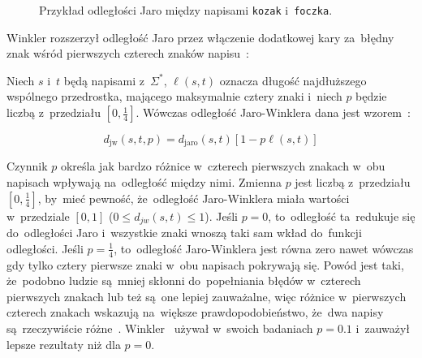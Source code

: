 \documentclass{praca1}
\begin{document}
\begin{figure}[width=80pt]
\centering
{}
\cprotect\caption{Przykład odległości Jaro między napisami \verb|kozak| i~\verb|foczka|.}\label{rys:005}
\end{figure}


Winkler rozszerzył odległość Jaro przez włączenie dodatkowej kary za~błędny znak wśród pierwszych czterech znaków napisu~\cite{Loo2014:stringdist}:

\begin{definition}
Niech $s$ i~$t$ będą napisami z~$\Sigma^*$, $\ell(s,t)$ oznacza długość najdłuższego wspólnego przedrostka, mającego maksymalnie cztery znaki i~niech $p$ będzie liczbą z~przedziału $[0, \frac{1}{4}]$. Wówczas odległość Jaro-Winklera dana jest wzorem~\cite{Winkler1990:stringcomparator}:

\begin{equation}
\label{eq:012}
d_{\mathrm{jw}}(s,t, p) = d_{\mathrm{jaro}}(s,t)[1 - p\ell(s,t)]
\end{equation}
\end{definition}

Czynnik $p$ określa jak bardzo różnice w~czterech pierwszych znakach w~obu napisach wpływają na~odległość między nimi. Zmienna $p$ jest liczbą z~przedziału $[0, \frac{1}{4}]$, by~mieć pewność, że~odległość Jaro-Winklera miała wartości w~przedziale $[0,1]$ ($0 \leq d_{jw}(s,t) \leq 1$). Jeśli $p=0$, to~odległość ta~redukuje się do~odległości Jaro i~wszystkie znaki wnoszą taki sam wkład do~funkcji odległości. Jeśli $p = \frac{1}{4}$, to~odległość Jaro-Winklera jest równa zero nawet wówczas gdy tylko cztery pierwsze znaki w~obu napisach pokrywają się. Powód jest taki, że~podobno ludzie są~mniej skłonni do~popełniania błędów w~czterech pierwszych znakach lub też są~one lepiej zauważalne, więc różnice w~pierwszych czterech znakach wskazują na~większe prawdopodobieństwo, że~dwa napisy są~rzeczywiście różne~\cite{Loo2014:stringdist}. Winkler~\cite{Winkler1990:stringcomparator} używał w~swoich badaniach $p = 0.1$ i~zauważył lepsze rezultaty niż dla $p = 0$.
\end{document}
